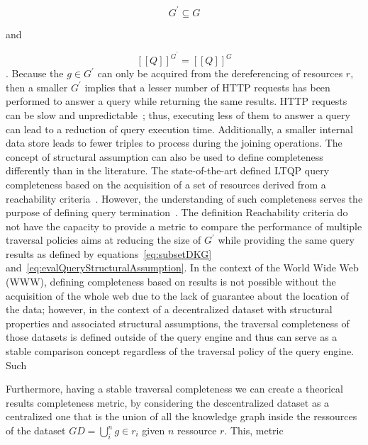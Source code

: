\begin{equation}\label{eq:subsetDKG}
G^{\prime} \subseteq G
\end{equation}

and 

\begin{equation}\label{eq:evalQueryStructuralAssumption}
   [\![ Q ]\!]^{G^{\prime}} = [\![ Q ]\!]^{G}
\end{equation}
.
Because the $g \in G^{\prime}$ can only be acquired from the dereferencing of resources $r$, then a smaller $G^\prime$ implies that a lesser number of HTTP requests has been performed to answer a query
while returning the same results.
HTTP requests can be slow and unpredictable~\cite {hartig2016walking}; thus, executing less of them to answer a query can lead to a reduction of query execution time.
Additionally, a smaller internal data store leads to fewer triples to process during the joining operations.
The concept of structural assumption can also be used to define completeness differently than in the literature.
The state-of-the-art defined LTQP query completeness based on the acquisition of a set of resources derived from a reachability criteria~\cite{Hartig2012}.
However, the understanding of such completeness serves the purpose of defining query termination~\cite{Hartig2012}.
The definition Reachability criteria do not have the capacity to provide a metric to compare the performance of multiple traversal policies aims 
at reducing the size of $G^{\prime}$ while providing the same query results as defined by equations~\ref{eq:subsetDKG} and~\ref{eq:evalQueryStructuralAssumption}.
In the context of the World Wide Web (WWW), defining completeness based on results is not possible without the acquisition of the whole web due to the lack of guarantee about the location of the data; however,
in the context of a decentralized dataset with structural properties and associated structural assumptions, the traversal completeness of those datasets is defined outside of the query engine and thus can serve as a 
stable comparison concept regardless of the traversal policy of the query engine.
Such 




Furthermore, having a stable traversal completeness we can create a theorical results completeness metric, by considering the descentralized dataset as a centralized one that is the union 
of all the knowledge graph inside the ressources of the dataset $GD = \bigcup\limits_{i}^{n} g\in r_i$ given $n$ ressource $r$.
This, metric 

